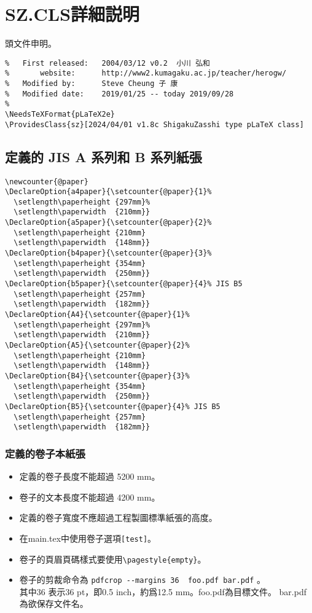 \section{SZ.CLS詳細説明}
\par%
頭文件申明。
\begin{lstlisting}[firstnumber=1]
%   File:             ShigakuZasshi type pLaTeX class
%   First released:   2004/03/12 v0.2  小川 弘和
%       website:      http://www2.kumagaku.ac.jp/teacher/herogw/
%   Modified by:      Steve Cheung 子 康
%   Modified date:    2019/01/25 -- today 2019/09/28
%
\NeedsTeXFormat{pLaTeX2e}
\ProvidesClass{sz}[2024/04/01 v1.8c ShigakuZasshi type pLaTeX class]
\end{lstlisting}

\subsection{定義的 JIS A 系列和 B 系列紙張}
\begin{lstlisting}[firstnumber=11]
\newcounter{@paper}
\DeclareOption{a4paper}{\setcounter{@paper}{1}%
  \setlength\paperheight {297mm}%
  \setlength\paperwidth  {210mm}}
\DeclareOption{a5paper}{\setcounter{@paper}{2}%
  \setlength\paperheight {210mm}
  \setlength\paperwidth  {148mm}}
\DeclareOption{b4paper}{\setcounter{@paper}{3}%
  \setlength\paperheight {354mm}
  \setlength\paperwidth  {250mm}}
\DeclareOption{b5paper}{\setcounter{@paper}{4}% JIS B5
  \setlength\paperheight {257mm}
  \setlength\paperwidth  {182mm}}
\DeclareOption{A4}{\setcounter{@paper}{1}%
  \setlength\paperheight {297mm}%
  \setlength\paperwidth  {210mm}}
\DeclareOption{A5}{\setcounter{@paper}{2}%
  \setlength\paperheight {210mm}
  \setlength\paperwidth  {148mm}}
\DeclareOption{B4}{\setcounter{@paper}{3}%
  \setlength\paperheight {354mm}
  \setlength\paperwidth  {250mm}}
\DeclareOption{B5}{\setcounter{@paper}{4}% JIS B5
  \setlength\paperheight {257mm}
  \setlength\paperwidth  {182mm}}
\end{lstlisting}

\subsubsection{定義的卷子本紙張}
\par{}
\begin{itemize}
\item 定義的卷子長度不能超過 5200 mm。
\item 卷子的文本長度不能超過 4200 mm。
\item 定義的卷子寬度不應超過工程製圖標準紙張的高度。
\item	在main.tex中使用卷子選項\verb+[test]+。
\item 卷子的頁眉頁碼樣式要使用\verb+\pagestyle{empty}+。
\item 卷子的剪裁命令為 {\color{red}\verb+pdfcrop --margins 36  foo.pdf bar.pdf+} 。\\
其中36 表示36 pt，即0.5 inch，約爲12.5 mm。foo.pdf為目標文件。
bar.pdf為欲保存文件名。
\end{itemize}

